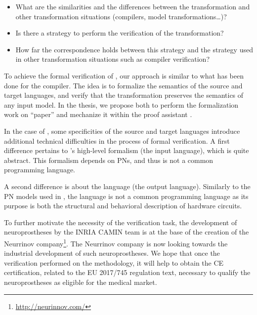 \documentclass[pdflatex,sn-mathphys]{sn-jnl}%
\theoremstyle{thmstyleone}%
\theoremstyle{thmstyletwo}%
\theoremstyle{thmstylethree}%
\begin{document}
\begin{itemize}
\item What are the similarities and the differences between the
  \hilecop{} transformation and other transformation situations
  (compilers, model transformations\dots)?
\item Is there a strategy to perform the verification of the
  \hilecop{} transformation?
\item How far the correspondence holds between this strategy and the
  strategy used in other transformation situations such as compiler
  verification?
\end{itemize}

To achieve the formal verification of \hilecop{}, our approach is
similar to what has been done for the \ccert{} compiler. The idea is
to formalize the semantics of the source and target languages, and
verify that the transformation preserves the semantics of any input
model. In the thesis, we propose both to perform the formalization
work on ``paper'' and mechanize it within the \coq{} proof assistant
\cite{Bertot2004}.

In the case of \hilecop{}, some specificities of the source and target
languages introduce additional technical difficulties in the process
of formal verification. A first difference pertains to \hilecop{}'s
high-level formalism (the input language), which is quite
abstract. This formalism depends on PNs, and thus is not a common
programming language.

A second difference is about the \vhdl{} language (the output
language).  Similarly to the PN models used in \hilecop{}, the \vhdl{}
language is not a common programming language as its purpose is both
the structural and behavioral description of hardware
circuits. %


To further motivate the necessity of the verification task, the
development of neuroprostheses by the INRIA CAMIN team is at the base
of the creation of the Neurrinov
company\footnote{\url{http://neurinnov.com/}}. The Neurrinov company
is now looking towards the industrial development of such
neuroprostheses. We hope that once the verification performed on the
\hilecop{} methodology, it will help to obtain the CE certification,
related to the EU 2017/745 regulation text, necessary to qualify the
neuroprostheses as eligible for the medical market.
\end{document}
